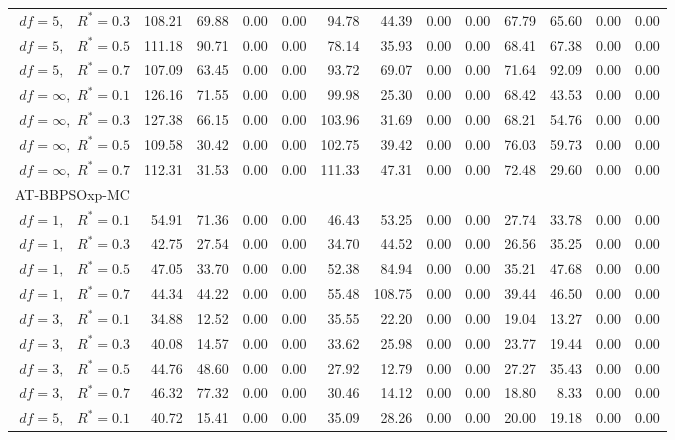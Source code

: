 \documentclass[12pt]{article}
\begin{document}
\begin{table}[ht]
{\begin{tabular}{r|rrrr|rrrr|rrrr}
  $df = 5,\enspace$ $R^* =0.3$ & 108.21 & 69.88 & 0.00 & 0.00 & 94.78 & 44.39 & 0.00 & 0.00 & 67.79 & 65.60 & 0.00 & 0.00 \\ 
  $df = 5,\enspace$ $R^* =0.5$ & 111.18 & 90.71 & 0.00 & 0.00 & 78.14 & 35.93 & 0.00 & 0.00 & 68.41 & 67.38 & 0.00 & 0.00 \\ 
  $df = 5,\enspace$ $R^* =0.7$ & 107.09 & 63.45 & 0.00 & 0.00 & 93.72 & 69.07 & 0.00 & 0.00 & 71.64 & 92.09 & 0.00 & 0.00 \\ 
  $df = \infty,$ $R^* =0.1$ & 126.16 & 71.55 & 0.00 & 0.00 & 99.98 & 25.30 & 0.00 & 0.00 & 68.42 & 43.53 & 0.00 & 0.00 \\ 
  $df = \infty,$ $R^* =0.3$ & 127.38 & 66.15 & 0.00 & 0.00 & 103.96 & 31.69 & 0.00 & 0.00 & 68.21 & 54.76 & 0.00 & 0.00 \\ 
  $df = \infty,$ $R^* =0.5$ & 109.58 & 30.42 & 0.00 & 0.00 & 102.75 & 39.42 & 0.00 & 0.00 & 76.03 & 59.73 & 0.00 & 0.00 \\ 
  $df = \infty,$ $R^* =0.7$ & 112.31 & 31.53 & 0.00 & 0.00 & 111.33 & 47.31 & 0.00 & 0.00 & 72.48 & 29.60 & 0.00 & 0.00 \\ 
\hline
\multicolumn{1}{l|}{AT-BBPSOxp-MC} &&&&&&&&&&&&\\
  $df = 1,\enspace$ $R^* =0.1$ & 54.91 & 71.36 & 0.00 & 0.00 & 46.43 & 53.25 & 0.00 & 0.00 & 27.74 & 33.78 & 0.00 & 0.00 \\ 
  $df = 1,\enspace$ $R^* =0.3$ & 42.75 & 27.54 & 0.00 & 0.00 & 34.70 & 44.52 & 0.00 & 0.00 & 26.56 & 35.25 & 0.00 & 0.00 \\ 
  $df = 1,\enspace$ $R^* =0.5$ & 47.05 & 33.70 & 0.00 & 0.00 & 52.38 & 84.94 & 0.00 & 0.00 & 35.21 & 47.68 & 0.00 & 0.00 \\ 
  $df = 1,\enspace$ $R^* =0.7$ & 44.34 & 44.22 & 0.00 & 0.00 & 55.48 & 108.75 & 0.00 & 0.00 & 39.44 & 46.50 & 0.00 & 0.00 \\ 
  $df = 3,\enspace$ $R^* =0.1$ & 34.88 & 12.52 & 0.00 & 0.00 & 35.55 & 22.20 & 0.00 & 0.00 & 19.04 & 13.27 & 0.00 & 0.00 \\ 
  $df = 3,\enspace$ $R^* =0.3$ & 40.08 & 14.57 & 0.00 & 0.00 & 33.62 & 25.98 & 0.00 & 0.00 & 23.77 & 19.44 & 0.00 & 0.00 \\ 
  $df = 3,\enspace$ $R^* =0.5$ & 44.76 & 48.60 & 0.00 & 0.00 & 27.92 & 12.79 & 0.00 & 0.00 & 27.27 & 35.43 & 0.00 & 0.00 \\ 
  $df = 3,\enspace$ $R^* =0.7$ & 46.32 & 77.32 & 0.00 & 0.00 & 30.46 & 14.12 & 0.00 & 0.00 & 18.80 & 8.33 & 0.00 & 0.00 \\ 
  $df = 5,\enspace$ $R^* =0.1$ & 40.72 & 15.41 & 0.00 & 0.00 & 35.09 & 28.26 & 0.00 & 0.00 & 20.00 & 19.18 & 0.00 & 0.00 \\ 

\end{tabular}}
\end{table}
\end{document}
